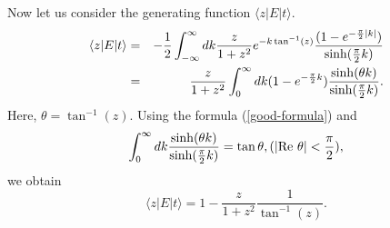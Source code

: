 \documentclass[a4paper,12pt]{article}
\begin{document}
Now let us consider the generating function $\langle z|E|t\rangle$.
\begin{eqnarray}
\langle z|E|t\rangle &=&
-{1\over 2}\int_{-\infty}^{\infty}dk \frac{z}{1+z^2}e^{-k\tan^{-1}(z)}
{(1-e^{-{\pi\over 2}|k|})\over \sinh({\pi\over2}k)}\\
&=&
\frac{z}{1+z^2}\int_0^{\infty}dk(1-e^{-\frac{\pi}{2}k})
\frac{\sinh(\theta k)}{\sinh(\frac{\pi}{2}k)}.
\end{eqnarray}
Here, $\theta=\tan^{-1}(z)$.
Using the formula (\ref{good-formula}) and
\begin{equation}
\int_0^{\infty}dk\frac{\sinh(\theta k)}{\sinh(\frac{\pi}{2}k)}
=\tan\theta,(|{\rm Re}\ \theta|<\frac{\pi}{2}),
\end{equation}
we obtain
\begin{equation}\label{zet}
\langle z|E|t\rangle
=1-\frac{z}{1+z^2}\frac{1}{\tan^{-1}(z)}.
\end{equation}
\end{document}

